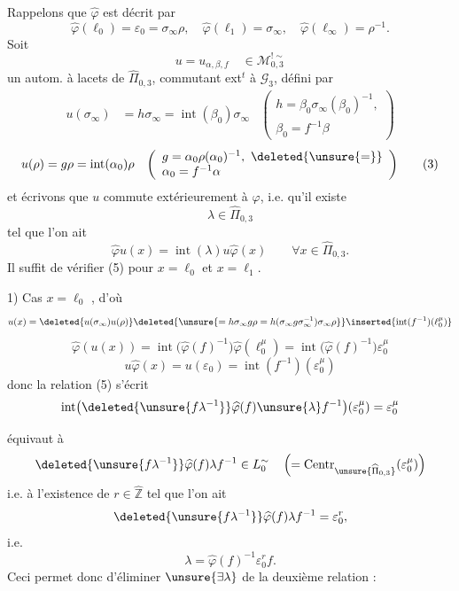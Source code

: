 Rappelons  que $\widehat\varphi$ est décrit par
\[
\widehat\varphi(\ell_0)=\varepsilon_0=\sigma_\infty\rho,\quad
\widehat\varphi(\ell_1)=\sigma_\infty,\quad
\widehat\varphi(\ell_\infty)=\rho^{-1}.
\tag{1}
\]
Soit
\[
u=u_{\alpha,\beta,f}\quad\in\mathcal M_{0,3}^{!\sim}
\]
un autom. à lacets de $\widehat\Pi_{0,3}$, commutant ext${}^{t}$ à $\mathcal G_3$, défini par
\[
\begin{aligned}
u(\sigma_\infty)&=h\sigma_\infty=\operatorname{int}(\beta_0)\sigma_\infty
&\left(\begin{array}{l}h=\beta_0\sigma_\infty(\beta_0)^{-1},\\\beta_0=f^{-1}\beta\end{array}\right)
\end{aligned}
\tag{2}
\]
\[
\begin{aligned}
u(\rho)&=g\rho=\operatorname{int}(\alpha_0)\rho
&\left(\begin{array}{l}g=\alpha_0\rho(\alpha_0)^{-1},\ \deleted{\unsure{=}}\\\alpha_0=f^{-1}\alpha\end{array}\right)
\end{aligned}
\tag{3}
\]
et écrivons que $u$ commute extérieurement à $\varphi$, i.e. qu'il existe \deleted{\unsure{$\lambda\in$}}
\[
\lambda\in\widehat\Pi_{0,3}
\tag{4}
\]
tel que l'on ait
\[
\widehat\varphi u(x)=\operatorname{int}(\lambda)u\widehat\varphi(x)
\qquad\forall x\in\widehat\Pi_{0,3}.
\tag{5}
\]
Il suffit de vérifier (5) pour $x=\ell_0$ et $x=\ell_1$.

1) Cas $x=\ell_0$ , d'où
\[
u(x)=\deleted{u(\sigma_\infty)u(\rho)}\deleted{\unsure{=h\sigma_\infty g\rho=h(\sigma_\infty g\sigma_\infty^{-1})\sigma_\infty\rho}}
\inserted{\operatorname{int}(f^{-1})(\ell_0^\mu)}
\]
\[
\widehat\varphi(u(x))=\operatorname{int}\bigl(\widehat\varphi(f)^{-1}\bigr)\widehat\varphi(\ell_0^\mu)=\operatorname{int}\bigl(\widehat\varphi(f)^{-1}\bigr)\varepsilon_0^\mu
\]
\[
u\widehat\varphi(x)=u(\varepsilon_0)=\operatorname{int}(f^{-1})(\varepsilon_0^\mu)
\]
donc la relation (5) s'écrit
\[
\operatorname{int}\bigl(\deleted{\unsure{f\lambda^{-1}}}\widehat\varphi(f)\unsure{\lambda}f^{-1}\bigr)(\varepsilon_0^\mu)=\varepsilon_0^\mu
\]

équivaut à
\[
\deleted{\unsure{f\lambda^{-1}}}\widehat\varphi(f)\lambda f^{-1}\in L_0^{\sim}\quad
\left(=\operatorname{Centr}_{\unsure{\widehat\Pi_{0,3}}}(\varepsilon_0^\mu)\right)
\]
i.e. à l'existence de $r\in\widehat{\mathbb Z}$ tel que l'on ait
\[
\deleted{\unsure{f\lambda^{-1}}}\widehat\varphi(f)\lambda f^{-1}=\varepsilon_0^r,
\]
i.e.
\[
\lambda=\widehat\varphi(f)^{-1}\varepsilon_0^r f.
\tag{6}
\]
Ceci permet donc d'éliminer $\unsure{\exists\lambda}$ de la deuxième relation :

